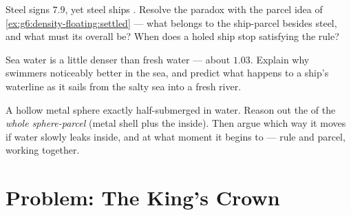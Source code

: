 \begin{exercise}[$\star\star$]\label{exo:g6:density-floating:10}
Steel signs $7.9$, yet steel ships . Resolve the paradox
with the parcel idea of
\cref{ex:g6:density-floating:settled} --- what belongs to the
ship-parcel besides steel, and what must its overall  be?
When does a holed ship stop satisfying the rule?
\end{exercise}

\begin{exercise}[$\star\star$]\label{exo:g6:density-floating:11}
Sea water is a little denser than fresh water --- about $1.03$.
Explain why swimmers  noticeably better in the sea, and
predict what happens to a ship's waterline as it sails from the
salty sea into a fresh river.
\end{exercise}

\begin{exercise}[$\star\star\star$]\label{exo:g6:density-floating:12}
A hollow metal sphere  exactly half-submerged in water.
Reason out the  of the \emph{whole sphere-parcel} (metal
shell plus the  inside). Then argue which way it moves if
water slowly leaks inside, and at what moment it begins to 
--- rule and parcel, working together.
\end{exercise}

\section{Problem: The King's Crown}

